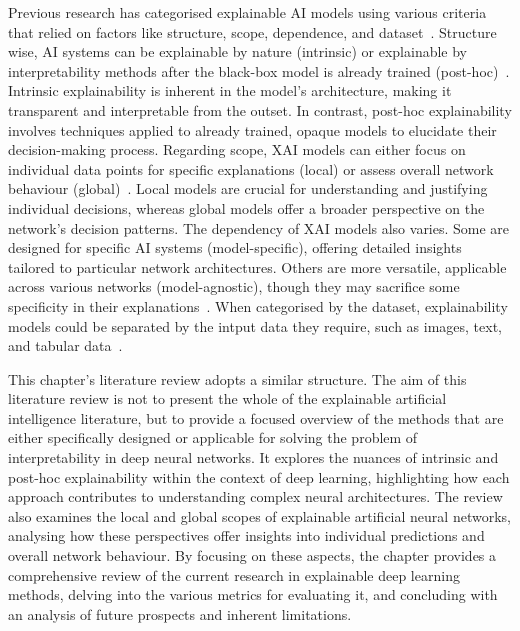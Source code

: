 Previous research has categorised explainable AI models using various criteria that relied on factors like structure, scope, dependence, and dataset~\cite{IbrahimS23}. Structure wise, AI systems can be explainable by nature (\ie intrinsic) or explainable by interpretability methods after the black-box model is already trained (\ie post-hoc)~\cite{DuLH20, abs-1901-04592}. Intrinsic explainability is inherent in the model's architecture, making it transparent and interpretable from the outset. In contrast, post-hoc explainability involves techniques applied to already trained, opaque models to elucidate their decision-making process. Regarding scope, XAI models can either focus on individual data points for specific explanations (local) or assess overall network behaviour (global)~\cite{LiCSBGQWGZXC22, ArrietaRSBTBGGM20, DuLH20}. Local models are crucial for understanding and justifying individual decisions, whereas global models offer a broader perspective on the network's decision patterns.
The dependency of XAI models also varies. Some are designed for specific AI systems (model-specific), offering detailed insights tailored to particular network architectures. Others are more versatile, applicable across various networks (model-agnostic), though they may sacrifice some specificity in their explanations~\cite{ArrietaRSBTBGGM20, DuLH20}. When categorised by the dataset, explainability models could be separated by the intput data they require, such as images, text, and tabular data~\cite{ArrietaRSBTBGGM20}.


This chapter's literature review adopts a similar structure. The aim of this literature review is not to present the whole of the explainable artificial intelligence literature, but to provide a focused overview of the methods that are either specifically designed or applicable for solving the problem of interpretability in deep neural networks. It explores the nuances of intrinsic and post-hoc explainability within the context of deep learning, highlighting how each approach contributes to understanding complex neural architectures. The review also examines the local and global scopes of explainable artificial neural networks, analysing how these perspectives offer insights into individual predictions and overall network behaviour. By focusing on these aspects, the chapter provides a comprehensive review of the current research in explainable deep learning methods, delving into the various metrics for evaluating it, and concluding with an analysis of future prospects and inherent limitations.

